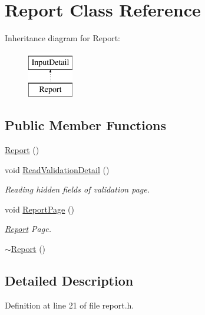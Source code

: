 \hypertarget{classReport}{\section{\-Report \-Class \-Reference}
\label{classReport}
}
\-Inheritance diagram for \-Report\-:\begin{figure}[H]
\begin{center}
\leavevmode
\includegraphics[height=2.000000cm]{classReport}
\end{center}
\end{figure}
\subsection*{\-Public \-Member \-Functions}
\begin{DoxyCompactItemize}
\item 
\hyperlink{classReport_ae3150817fcf4ebf814358baf5bd72e8f}{\-Report} ()
\item 
void \hyperlink{classReport_a4956ae80ad7ed501162a3a7345ccd2e8}{\-Read\-Validation\-Detail} ()
\begin{DoxyCompactList}\small\item\em \-Reading hidden fields of validation page. \end{DoxyCompactList}\item 
void \hyperlink{classReport_aa763587ca224dc7a1011c8e235937f24}{\-Report\-Page} ()
\begin{DoxyCompactList}\small\item\em \hyperlink{classReport}{\-Report} \-Page. \end{DoxyCompactList}\item 
\hyperlink{classReport_a93a2634da7bc52b01c39022d3639383b}{$\sim$\-Report} ()
\end{DoxyCompactItemize}


\subsection{\-Detailed \-Description}


\-Definition at line 21 of file report.\-h.



